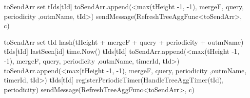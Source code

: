 \begin{algorithm}
\begin{algorithmic}[1]
     \label{alg:mon:tree_agg:propag}
        \State toSendArr \asdassign set 
            \State <tHeight, mergeF, query, periodicity, outmName, timerId, isLocal, isParentSub, ptId> \asdassign tIds[tId]
                \State toSendArr.append(<max(tHeight -1, -1), mergeF, query, periodicity ,outmName, tId>)
            \EndIf
        \EndFor
            \State sendMessage(RefreshTreeAggFunc<toSendArr>, c)
        \EndFor
    \asdend

     \label{alg:mon:tree_agg:propag_recv}
            \State toSendArr \asdassign set
                \State tId \asdassign hash(tHeight + mergeF + query + periodicity + outmName)
                    \State <tHeight, mergeF, query, periodicity, outmName, timerId, isLocal, isParentSub, ptId> \asdassign tIds[tId]
                    \State lastSeen[id] \asdassign time.Now()
                    \State tIds[tId] \asdassign <tHeight, mergeF, query, periodicity, outmName, timerId, isLocal, true, ptId>
                        \State toSendArr.append(<max(tHeight -1, -1), mergeF, query, periodicity ,outmName, timerId, tId>)
                    \EndIf
                \Else
                    \State toSendArr.append(<max(tHeight -1, -1), mergeF, query, periodicity ,outmName, timerId, tId>)
                    \State tIds[tId] \asdassign <tHeight, mergeF, query, periodicity, outmName, timerId, false, true, ptId>
                    \State registerPeriodicTimer(HandleTreeAggTimer(tId), periodicity)
                \EndIf
            \EndFor
                \State sendMessage(RefreshTreeAggFunc<toSendArr>, c)
            \EndFor
        \EndIf
    \asdend

    \end{algorithmic}
\end{algorithm}
    